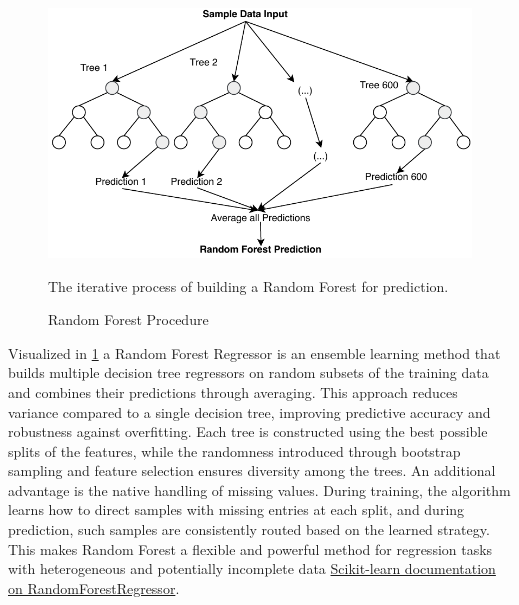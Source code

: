 \label{sec:background_ml_rfr}
\begin{figure}[H]
    \centering
    \includegraphics[scale=0.7]{fig/02/02-rf.pdf}
    \small
    \caption{Random Forest Procedure}
    \label{fig:02-rf}
    \tiny
    The iterative process of building a Random Forest for prediction.
\end{figure}

Visualized in \ref{fig:02-rf} a Random Forest Regressor is an ensemble learning method that builds multiple decision tree regressors on random subsets of the training data and combines their predictions through averaging. This approach reduces variance compared to a single decision tree, improving predictive accuracy and robustness against overfitting. Each tree is constructed using the best possible splits of the features, while the randomness introduced through bootstrap sampling and feature selection ensures diversity among the trees. An additional advantage is the native handling of missing values. During training, the algorithm learns how to direct samples with missing entries at each split, and during prediction, such samples are consistently routed based on the learned strategy. This makes Random Forest a flexible and powerful method for regression tasks with heterogeneous and potentially incomplete data \cite{Breiman2001RandomF} \href{https://scikit-learn.org/stable/modules/generated/sklearn.ensemble.RandomForestRegressor.html}{Scikit-learn documentation on RandomForestRegressor}.

\label{sec:background_ml_ac}

